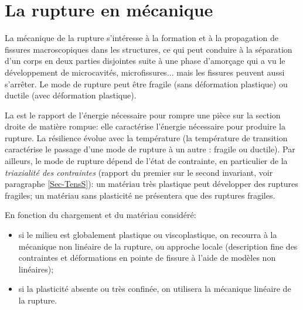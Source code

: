 \chapter{La rupture en mécanique}\label{Ch-rupt}
La mécanique de la rupture s'intéresse à la formation et à la propagation de fissures
macroscopiques dans les structures, ce qui peut conduire à la séparation d'un corps en deux
parties disjointes suite à une phase d'amorçage qui a vu le développement de microcavités,
microfissures... mais les fissures peuvent aussi s'arrêter.
Le mode de rupture peut être fragile (sans déformation plastique) ou ductile (avec déformation
plastique).

\medskip
La  est le rapport de l'énergie nécessaire pour rompre une pièce sur la
section droite de matière rompue: elle caractérise l'énergie nécessaire pour produire la rupture.
La résilience évolue avec la température (la température de transition caractérise le passage
d'une mode de rupture à un autre : fragile ou ductile). Par ailleurs, le mode de rupture dépend de l'état de contrainte, en particulier de la \emph{triaxialité des contraintes} (rapport du premier sur le second invariant, voir paragraphe \ref{Sec-TensS}): un matériau très plastique peut développer des ruptures fragiles; un matériau sans plasticité ne présentera que des ruptures fragiles.

\medskip
En fonction du chargement et du matériau considéré:
\begin{itemize}
   \item si le milieu est globalement plastique ou viscoplastique, on recourra à la mécanique
	non linéaire de la rupture, ou approche locale (description fine des contraintes et déformations
	en pointe de fissure à l'aide de modèles non linéaires);
   \item si la plasticité absente ou très confinée, on utilisera la mécanique linéaire de la rupture.
\end{itemize}

%
%





\medskip
